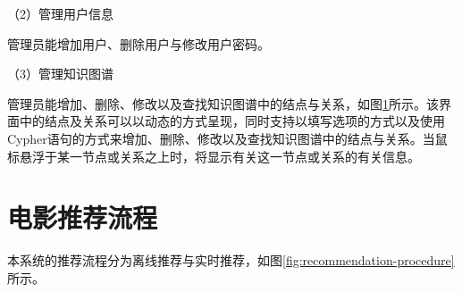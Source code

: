 \documentclass{bjfuthesis}
\begin{document}
\noindent （2）管理用户信息

管理员能增加用户、删除用户与修改用户密码。

\noindent （3）管理知识图谱

管理员能增加、删除、修改以及查找知识图谱中的结点与关系，如图\ref{fig:admin-knowledge-graph}所示。该界面中的结点及关系可以以动态的方式呈现，同时支持以填写选项的方式以及使用Cypher语句的方式来增加、删除、修改以及查找知识图谱中的结点与关系。当鼠标悬浮于某一节点或关系之上时，将显示有关这一节点或关系的有关信息。
\begin{figure}
	\label{fig:admin-knowledge-graph}
\end{figure}
\section{电影推荐流程}
本系统的推荐流程分为离线推荐与实时推荐，如图\ref{fig:recommendation-procedure}所示。
\end{document}
